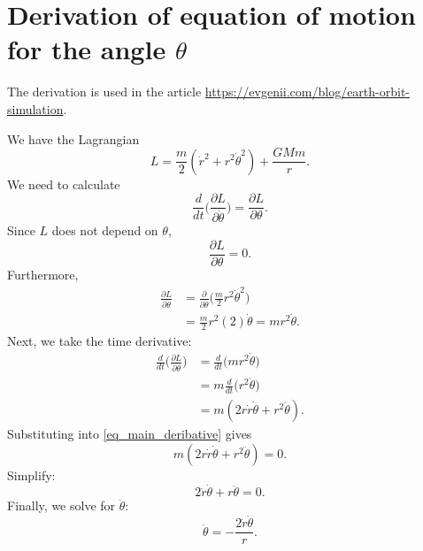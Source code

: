\documentclass[a4paper,twoside,12pt,hidelinks]{article}
\begin{document}
\section*{Derivation of equation of motion for the angle $\theta$}

The derivation is used in the article \href{https://evgenii.com/blog/earth-orbit-simulation/}{https://evgenii.com/blog/earth-orbit-simulation}.

We have the Lagrangian
\begin{equation*}
  L = \frac{m}{2} (\dot{r}^2 + r^2 \dot{\theta}^2) + \frac{G M m}{r}.
\end{equation*}
We need to calculate
\begin{equation}
  \frac{d}{dt} \Big( \frac{\partial L}{\partial \dot{\theta}} \Big) = \frac{\partial L}{\partial \theta}.
  \label{eq_main_deribative}
\end{equation}
Since $L$ does not depend on $\theta$,
\[
  \frac{\partial L}{\partial \theta} = 0.
\]
Furthermore,
\begin{align*}
   \frac{\partial L}{\partial \dot{\theta}} &= \frac{\partial }{\partial \dot{\theta}} \Big( \frac{m}{2} r^2 \dot{\theta}^2 \Big) \\
    &= \frac{m}{2} r^2 (2) \dot{\theta} = m r^2 \dot{\theta}.
\end{align*}
Next, we take the time derivative:
\begin{align*}
   \frac{d}{dt} \Big( \frac{\partial L}{\partial \dot{\theta}} \Big) &= \frac{d}{dt} \Big( m r^2 \dot{\theta} \Big) \\
    &= m \frac{d}{dt} \Big( r^2 \dot{\theta} \Big) \\
    &= m (2 r \dot{r} \dot{\theta} + r^2 \ddot{\theta}). \tag{Product rule}
\end{align*}
Substituting into \autoref{eq_main_deribative} gives
\[
  m ( 2 r \dot{r} \dot{\theta} + r^2 \ddot{\theta} ) = 0.
\]
Simplify:
\[
  2 \dot{r} \dot{\theta} + r \ddot{\theta} = 0.
\]
Finally, we solve for $\ddot{\theta}$:
\[
  \ddot{\theta} = - \frac{2 \dot{r} \dot{\theta}}{r}.
\]
\end{document}

